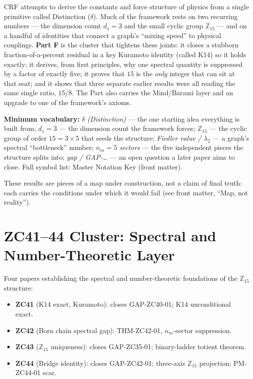 \documentclass[12pt, a4paper]{article}
\begin{document}
\begin{keybox}[title={If you are just arriving --- Part F in plain language}]
\sloppy
CRF attempts to derive the constants and force structure of physics from a
single primitive called Distinction ($\delta$). Much of the framework rests on
two recurring numbers --- the dimension count $d_s=3$ and the small cyclic group
$\mathbb{Z}_{15}$ --- and on a handful of identities that connect a graph's
``mixing speed'' to physical couplings. \textbf{Part F} is the cluster that
tightens these joints: it closes a stubborn fraction-of-a-percent residual in a
key Kuramoto identity (called K14) so it holds exactly; it derives, from first
principles, why one spectral quantity is suppressed by a factor of exactly five;
it proves that $15$ is the \emph{only} integer that can sit at that seat; and it
shows that three separate earlier results were all reading the same single ratio,
$15/8$. The Part also carries the Mind/Barami layer and an upgrade to one of the
framework's axioms.

\textbf{Minimum vocabulary:}
\textit{$\delta$ (Distinction)} --- the one starting idea everything is built
from;\;
\textit{$d_s=3$} --- the dimension count the framework forces;\;
\textit{$\mathbb{Z}_{15}$} --- the cyclic group of order $15=3\times5$ that seeds
the structure;\;
\textit{Fiedler value / $\lambda_2$} --- a graph's spectral ``bottleneck''
number;\;
\textit{$n_m=5$ sectors} --- the five independent pieces the structure splits
into;\;
\textit{gap / GAP-\dots} --- an open question a later paper aims to close.
Full symbol list: Master Notation Key (front matter).

These results are pieces of a map under construction, not a claim of final
truth: each carries the conditions under which it would fail (see front
matter, ``Map, not reality'').
\end{keybox}

\clearpage

\part{ZC41--44 Cluster: Spectral and Number-Theoretic Layer}
\label{part:xxxi}

\begin{keybox}[title={Part XXXI Overview}]
Four papers establishing the spectral and number-theoretic
foundations of the $\mathbb{Z}_{15}$ structure:
\begin{itemize}[leftmargin=*, noitemsep]
\item \textbf{ZC41} (K14 exact, Kuramoto): closes GAP-ZC40-01;
  K14 unconditional exact.
\item \textbf{ZC42} (Born chain spectral gap): THM-ZC42-01,
  $n_m$-sector suppression.
\item \textbf{ZC43} ($\mathbb{Z}_{15}$ uniqueness): closes
  GAP-ZC35-01; binary-ladder totient theorem.
\item \textbf{ZC44} (Bridge identity): closes GAP-ZC42-01;
  three-axis $\mathbb{Z}_{15}$ projection; PM-ZC44-01 scar.
\end{itemize}
\end{keybox}
\end{document}
